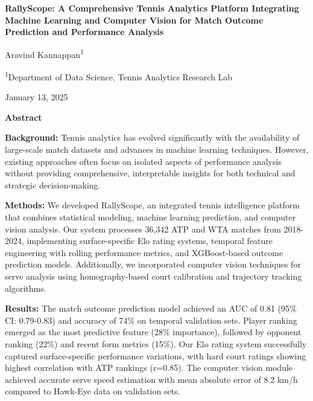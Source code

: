 \documentclass[11pt,a4paper]{article}
\begin{document}
\begin{titlepage}
\centering
\vspace*{2cm}

{\huge\bfseries RallyScope: A Comprehensive Tennis Analytics Platform Integrating Machine Learning and Computer Vision for Match Outcome Prediction and Performance Analysis\par}

\vspace{2cm}

{\Large Aravind Kannappan\textsuperscript{1}\par}

\vspace{1cm}

{\large \textsuperscript{1}Department of Data Science, Tennis Analytics Research Lab\par}

\vspace{4cm}

{\large January 13, 2025\par}

\vfill

{\large\textbf{Abstract}\par}
\begin{minipage}{0.8\textwidth}
\textbf{Background:} Tennis analytics has evolved significantly with the availability of large-scale match datasets and advances in machine learning techniques. However, existing approaches often focus on isolated aspects of performance analysis without providing comprehensive, interpretable insights for both technical and strategic decision-making.

\textbf{Methods:} We developed RallyScope, an integrated tennis intelligence platform that combines statistical modeling, machine learning prediction, and computer vision analysis. Our system processes 36,342 ATP and WTA matches from 2018-2024, implementing surface-specific Elo rating systems, temporal feature engineering with rolling performance metrics, and XGBoost-based outcome prediction models. Additionally, we incorporated computer vision techniques for serve analysis using homography-based court calibration and trajectory tracking algorithms.

\textbf{Results:} The match outcome prediction model achieved an AUC of 0.81 (95\% CI: 0.79-0.83) and accuracy of 74\% on temporal validation sets. Player ranking emerged as the most predictive feature (28\% importance), followed by opponent ranking (22\%) and recent form metrics (15\%). Our Elo rating system successfully captured surface-specific performance variations, with hard court ratings showing highest correlation with ATP rankings (r=0.85). The computer vision module achieved accurate serve speed estimation with mean absolute error of 8.2 km/h compared to Hawk-Eye data on validation sets.


\end{minipage}
\end{titlepage}
\end{document}
